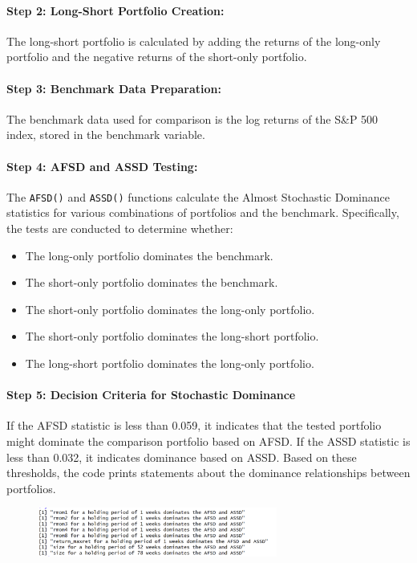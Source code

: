 \documentclass{article}
\begin{document}
\paragraph{Step 2: Long-Short Portfolio Creation:}
The long-short portfolio is calculated by adding the returns of the long-only portfolio and the negative returns of the short-only portfolio.

\paragraph{Step 3: Benchmark Data Preparation:}
The benchmark data used for comparison is the log returns of the S\&P 500 index, stored in the benchmark variable.

\paragraph{Step 4: AFSD and ASSD Testing:}
The \texttt{AFSD()} and \texttt{ASSD()} functions calculate the Almost Stochastic Dominance statistics for various combinations of portfolios and the benchmark. Specifically, the tests are conducted to determine whether:
\begin{itemize}
    \item The long-only portfolio dominates the benchmark.
    \item The short-only portfolio dominates the benchmark.
    \item The short-only portfolio dominates the long-only portfolio.
    \item The short-only portfolio dominates the long-short portfolio.
    \item The long-short portfolio dominates the long-only portfolio.
\end{itemize}

\paragraph{Step 5: Decision Criteria for Stochastic Dominance}
If the AFSD statistic is less than 0.059, it indicates that the tested portfolio might dominate the comparison portfolio based on AFSD. If the ASSD statistic is less than 0.032, it indicates dominance based on ASSD. Based on these thresholds, the code prints statements about the dominance relationships between portfolios.
\begin{figure}[H]
    \centering
    \includegraphics[width=0.7\textwidth]{18.png}
    \label{fig:example}
\end{figure}
\end{document}
